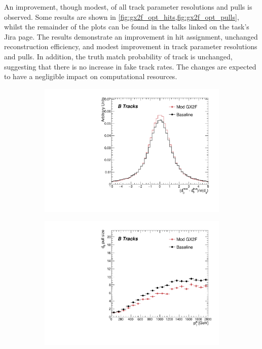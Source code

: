 %
An improvement, though modest, of all track parameter resolutions and pulls is observed. Some results are shown in \cref{fig:gx2f_opt_hits,fig:gx2f_opt_pulls}, whilst the remainder of the plots can be found in the talks linked on the task's Jira page. The results demonstrate an improvement in hit assignment, unchanged reconstruction efficiency, and modest improvement in track parameter resolutions and pulls. In addition, the truth match probability of track is unchanged, suggesting that there is no increase in fake track rates. The changes are expected to have a negligible impact on computational resources.

\begin{figure}[!htbp]
    \centering
    \begin{subfigure}{.5\textwidth}
      \centering
      \includegraphics[width=\textwidth]{chapters/3.tracking/figs/h_recoTruthPull_d0_From_B.pdf}
    \end{subfigure}%
    \begin{subfigure}{.5\textwidth}
      \centering
      \includegraphics[width=\textwidth]{chapters/3.tracking/figs/p_d0_pull_size_pTB_From_B.pdf}

\end{subfigure}
\end{figure}
